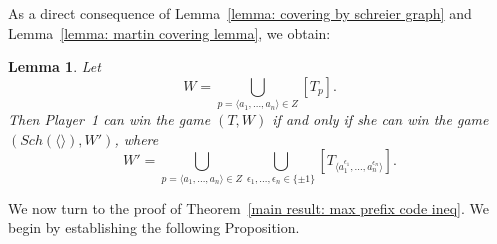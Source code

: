 \documentclass[a4,12pt]{article}%
\newtheorem{lemma}[theorem]{Lemma}
\begin{document}
\medskip

As a direct consequence of Lemma~\ref{lemma: covering by schreier graph} and Lemma~\ref{lemma: martin covering lemma}, we obtain:

\begin{lemma} \label{lemma:cover by sch}
Let 
\[
W = \bigcup_{p = \langle a_1, \dots, a_{n} \rangle \in Z} [T_p].
\]  
Then Player~1 can win the game $(T,W)$ if and only if she can win the game $(Sch(\langle \rangle), W')$, where
\[
W' = \bigcup_{p = \langle a_1, \dots, a_{n} \rangle \in Z} \bigcup_{\epsilon_1, \dots, \epsilon_{n} \in \{\pm 1\}} [T_{\langle a_1^{\epsilon_1}, \dots, a_{n}^{\epsilon_{n}} \rangle}].
\]
\end{lemma}

We now turn to the proof of Theorem~\ref{main result: max prefix code ineq}. We begin by establishing the following Proposition.
\end{document}

